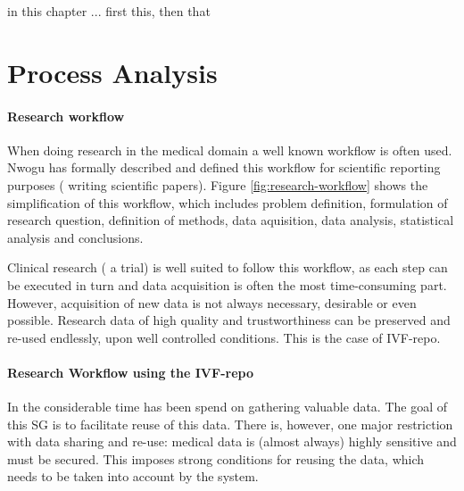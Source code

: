 in this chapter ...
first this, then that



\section{Process Analysis}
\label{process-analysis}


\paragraph{Research workflow}
When doing research in the medical domain a well known workflow is often used. Nwogu \cite{nwogu} has formally described and defined this workflow for scientific reporting purposes (\ie{} writing scientific papers).
Figure \ref{fig:research-workflow} shows the simplification of this workflow, which includes problem definition, formulation of research question, definition of methods, data aquisition, data analysis, statistical analysis and conclusions. 

Clinical research (\eg{} a trial) is well suited to follow this workflow, as each step can be executed in turn and data acquisition is often the most time-consuming part.
However, acquisition of new data is not always necessary,  desirable or even possible. 
Research data of high quality and trustworthiness can be preserved and re-used endlessly, upon well controlled conditions. 
This is the case of IVF-repo.

\paragraph{Research Workflow using the IVF-repo}
In the \project{} considerable time has been spend on gathering valuable data. The goal of this SG is to facilitate reuse of this data. 
There is, however, one major restriction with data sharing and re-use: medical data is (almost always) highly sensitive and must be secured. 
This imposes strong conditions for reusing the data, which needs to be taken into account by the system.


